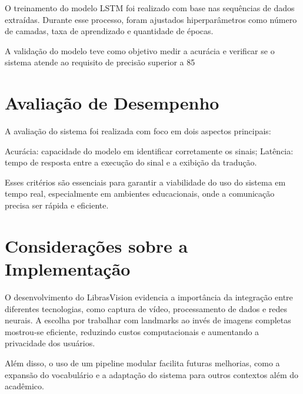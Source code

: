O treinamento do modelo LSTM foi realizado com base nas sequências de dados extraídas. Durante esse processo, foram ajustados hiperparâmetros como número de camadas, taxa de aprendizado e quantidade de épocas.

A validação do modelo teve como objetivo medir a acurácia e verificar se o sistema atende ao requisito de precisão superior a 85%

\section{Avaliação de Desempenho}

A avaliação do sistema foi realizada com foco em dois aspectos principais:

Acurácia: capacidade do modelo em identificar corretamente os sinais;
Latência: tempo de resposta entre a execução do sinal e a exibição da tradução.

Esses critérios são essenciais para garantir a viabilidade do uso do sistema em tempo real, especialmente em ambientes educacionais, onde a comunicação precisa ser rápida e eficiente.

\section{Considerações sobre a Implementação}

O desenvolvimento do LibrasVision evidencia a importância da integração entre diferentes tecnologias, como captura de vídeo, processamento de dados e redes neurais. A escolha por trabalhar com landmarks ao invés de imagens completas mostrou-se eficiente, reduzindo custos computacionais e aumentando a privacidade dos usuários.

Além disso, o uso de um pipeline modular facilita futuras melhorias, como a expansão do vocabulário e a adaptação do sistema para outros contextos além do acadêmico.